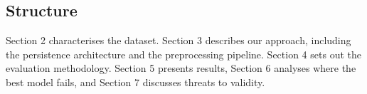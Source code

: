 \subsection{Structure}

Section 2 characterises the dataset. Section 3 describes our approach, including the persistence architecture and the preprocessing pipeline. Section 4 sets out the evaluation methodology. Section 5 presents results, Section 6 analyses where the best model fails, and Section 7 discusses threats to validity.